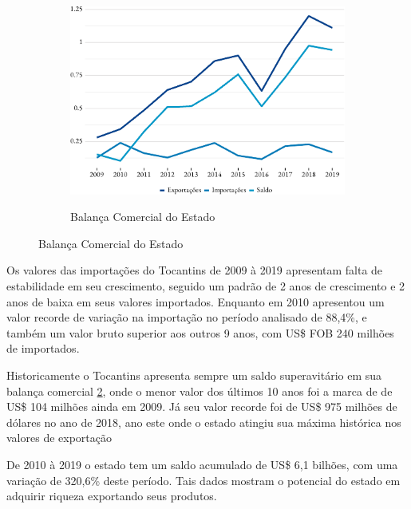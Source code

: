 \begin{figure}[!h]
		\begin{subfigure}{\linewidth}
		\caption{Balança Comercial do Estado}
		\includegraphics{fig/total-1.pdf}
		\label{fig:balanca}
	\end{subfigure}
\end{figure}


\par Os valores das importações do Tocantins de 2009 à 2019 apresentam falta de estabilidade em seu crescimento, seguido um padrão de 2 anos de crescimento e 2 anos de baixa em seus valores importados. Enquanto em 2010 apresentou um valor recorde de variação na importação no período analisado de 88,4\%, e também um valor bruto superior aos outros 9 anos, com US\$ FOB 240 milhões de importados.


\par Historicamente o Tocantins apresenta sempre um saldo superavitário em sua balança comercial \ref{fig:balanca}, onde o menor valor dos últimos 10 anos foi a marca de de US\$ 104 milhões ainda em 2009. Já seu valor recorde foi de US\$ 975 milhões de dólares no ano de 2018, ano este onde o estado atingiu sua máxima histórica nos valores de exportação

\par De 2010 à 2019 o estado tem um saldo acumulado de US\$ 6,1 bilhões, com uma variação de 320,6\% deste período. Tais dados mostram o potencial do estado em adquirir riqueza exportando seus produtos. 
